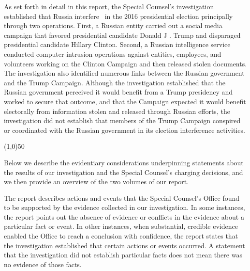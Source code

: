 \documentclass{article}
\newcommand{\hr}{\begin{center} \line(1,0){50} \end{center}}
\begin{document}
As set forth in detail in this report, the Special Counsel's investigation established that Russia interfere~ in the 2016 presidential election principally through two operations. First, a Russian entity carried out a  social media campaign that favored presidential candidate Donald J . Trump and disparaged presidential candidate Hillary Clinton. Second,  a  Russian intelligence service conducted computer-intrusion operations against entities, employees, and volunteers working on the Clinton Campaign and then released stolen documents. The investigation also identified numerous links between the Russian government and the Trump Campaign. Although the investigation established that the Russian government perceived it would benefit from a Trump presidency and worked to secure that outcome, and that the Campaign expected it would benefit electorally from information stolen and released through Russian efforts, the investigation did not establish that members of the Trump Campaign conspired or coordinated with the Russian government in its election interference activities.

\hr

Below we describe the evidentiary considerations underpinning statements about the results of our investigation and the Special Counsel's charging decisions, and we then provide an overview of the two volumes of our report.

The report describes actions and events that the Special Counsel's Office found to be supported by the evidence collected in our investigation. In some instances, the report points out the absence of evidence or conflicts in the evidence about a  particular fact or event. In other instances, when substantial, credible evidence enabled the Office to reach a  conclusion with confidence, the report states that the investigation established that certain actions or events occurred. A statement that the investigation did not establish particular facts does not mean there was no evidence of those facts.
\end{document}

